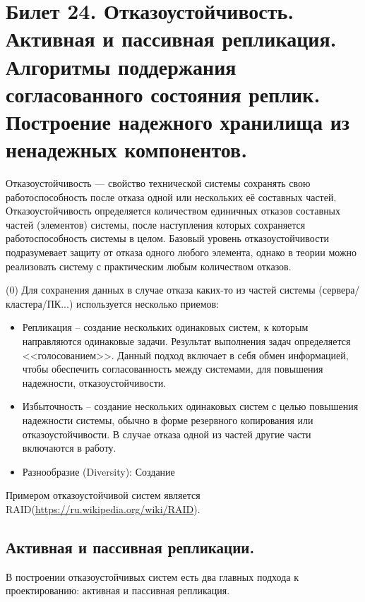 \newpage
\section{Билет 24. Отказоустойчивость. Активная и пассивная репликация. Алгоритмы поддержания согласованного состояния реплик. Построение надежного хранилища из ненадежных компонентов.}

Отказоустойчивость — свойство технической системы сохранять свою работоспособность после отказа одной или нескольких её составных частей. Отказоустойчивость определяется количеством единичных отказов составных частей (элементов) системы, после наступления которых сохраняется работоспособность системы в целом. Базовый уровень отказоустойчивости подразумевает защиту от отказа одного любого элемента, однако в теории можно реализовать систему с практическим любым количеством отказов.

\if (0)
Для сохранения данных в случае отказа каких-то из частей системы (сервера/кластера/ПК...) используется несколько приемов:
\begin{itemize}
	\item Репликация -- создание нескольких одинаковых систем, к которым направляются одинаковые задачи. Результат выполнения задач определяется <<голосованием>>. Данный подход включает в себя обмен информацией, чтобы обеспечить согласованность между системами, для повышения надежности, отказоустойчивости.
	\item Избыточность -- создание нескольких одинаковых систем с целью повышения надежности системы, обычно в форме резервного копирования или отказоустойчивости. В случае отказа одной из частей другие части включаются в работу.
	\item Разнообразие (Diversity): Создание 
\end{itemize}
\fi

Примером отказоустойчивой систем является RAID(\url{https://ru.wikipedia.org/wiki/RAID}).

\subsection{Активная и пассивная репликации.}
В построении отказоустойчивых систем есть два главных подхода к проектированию: активная и пассивная репликация.

